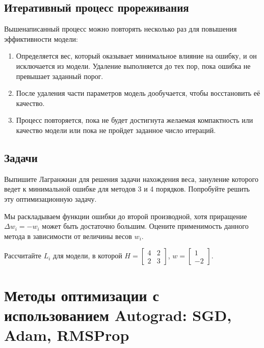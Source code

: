 \subsection*{Итеративный процесс прореживания}
Вышенаписанный процесс можно повторять несколько раз для повышения эффиктивности модели:
\begin{enumerate}
    \item Определяется вес, который оказывает минимальное влияние на ошибку, и он исключается из модели.
    Удаление выполняется до тех пор, пока ошибка не превышает заданный порог.
    \item После удаления части параметров модель дообучается, чтобы восстановить её качество.
    \item Процесс повторяется, пока не будет достигнута желаемая компактность или качество модели или пока не пройдет заданное число итераций.
\end{enumerate}

\subsection*{Задачи}
\begin{task}
Выпишите Лагранжиан для решения задачи нахождения веса, зануление которого ведет к минимальной ошибке для методов 3 и 4 порядков. Попробуйте решить эту оптимизационную задачу.
\end{task}

\begin{task}
Мы раскладываем функции ошибки до второй производной, хотя приращение $\Delta w_i = -w_i$ может быть достаточно большим. Оцените применимость данного метода в зависимости от величины весов $w_i$.
\end{task}

\begin{task}
Рассчитайте $L_i$ для модели, в которой $H = \begin{bmatrix} 4 & 2 \\ 2 & 3 \end{bmatrix}$, $w = \begin{bmatrix} 1 \\ -2 \end{bmatrix}$.
\end{task}


\section{Методы оптимизации с использованием Autograd: SGD, Adam, RMSProp}


